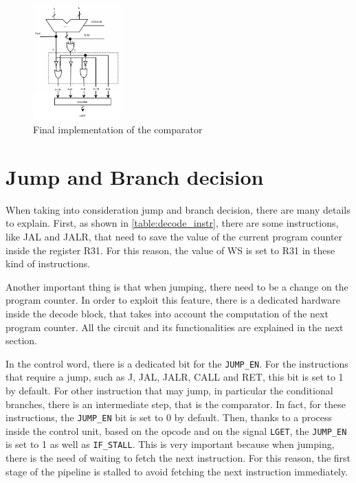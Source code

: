 \begin{figure}[H]
	\centering
	\includegraphics[width=0.3\textwidth]{chapters/4_DecodeStage/images/cmp_final.pdf}
	\caption{Final implementation of the comparator}
	\label{cmp_final}
\end{figure}

\section{Jump and Branch decision}
When taking into consideration jump and branch decision, there are many details to explain. First, as shown in \autoref{table:decode_instr}, there are some instructions, like JAL and JALR, that need to save the value of the current program counter inside the register R31. For this reason, the value of WS is set to R31 in these kind of instructions. 

Another important thing is that when jumping, there need to be a change on the program counter. In order to exploit this feature, there is a dedicated hardware inside the decode block, that takes into account the computation of the next program counter. All the circuit and its functionalities are explained in the next section. 

In the control word, there is a dedicated bit for the \texttt{JUMP\_EN}. For the instructions that require a jump, such as J, JAL, JALR, CALL and RET, this bit is set to 1 by default. For other instruction that may jump, in particular the conditional branches, there is an intermediate step, that is the comparator. In fact, for these instructions, the \texttt{JUMP\_EN} bit is set to 0 by default. Then, thanks to a process inside the control unit, based on the opcode and on the signal \texttt{LGET}, the \texttt{JUMP\_EN} is set to 1 as well as \texttt{IF\_STALL}. This is very important because when jumping, there is the need of waiting to fetch the next instruction. For this reason, the first stage of the pipeline is stalled to avoid fetching the next instruction immediately. 

